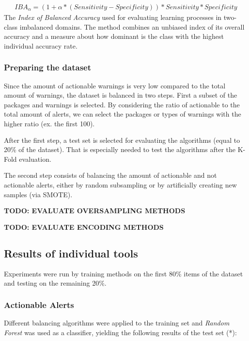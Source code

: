\begin{gather*}
IBA_{\alpha} = (1 + \alpha * (Sensitivity - Specificity)) * Sensitivity * Specificity
\end{gather*} 
The \textit{Index of Balanced Accuracy} used for evaluating learning processes in two-class imbalanced domains. The
method combines an unbiased index of its overall accuracy and a measure about
how dominant is the class with the highest individual accuracy rate.


\subsubsection{Preparing the dataset}
Since the amount of actionable warnings is very low compared to the total amount of warnings, the dataset is balanced in two steps. First a subset of the packages and warnings is selected. By considering the ratio of actionable to the total amount of alerts, we can select the packages or types of warnings with the higher ratio (ex. the first 100).

After the first step, a test set is selected for evaluating the algorithms (equal to 20\% of the dataset).
That is especially needed to test the algorithms after the K-Fold evaluation.

The second step consists of balancing the amount of actionable and not actionable alerts, either by random subsampling or by artificially creating new samples (via SMOTE).


\textbf{TODO: EVALUATE OVERSAMPLING METHODS}

\textbf{TODO: EVALUATE ENCODING METHODS}

\subsection{Results of individual tools}

Experiments were run by training methods on the first 80\% items of the dataset and testing on the remaining 20\%.

\subsubsection{Actionable Alerts}

Different balancing algorithms were applied to the training set and \textit{Random Forest} was used as a classifier, yielding the following results of the test set (*):

